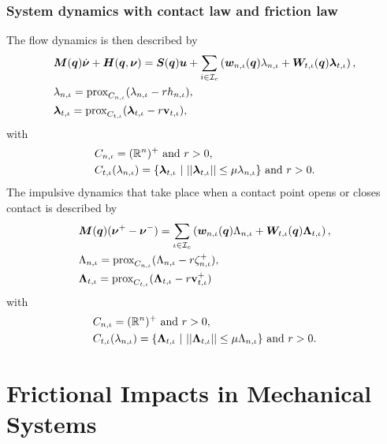 \documentclass[../DC2019003Bouma.tex]{subfiles}
\begin{document}
\subsection{System dynamics with contact law and friction law}
The flow dynamics is then described by
\begin{align}
&{\boldsymbol{M}}({\boldsymbol{q}})\dot{\boldsymbol{\nu}} + {\boldsymbol{H}}({\boldsymbol{q}},\boldsymbol{\nu}) = {\boldsymbol{S}}({\boldsymbol{q}}){\boldsymbol{u}} + \sum_{i\in\mathcal{I}_c}\left({\boldsymbol{w}}_{n,\iota}({\boldsymbol{q}})\lambda_{n,\iota} + {\boldsymbol{W}}_{t,\iota}({\boldsymbol{q}})\boldsymbol{\lambda}_{t,\iota} \right), \label{eq:proxcontact1}\\
&\lambda_{n,\iota} = \operatorname{\text{prox}}_{C_{n,\iota}}(\lambda_{n,\iota} - rh_{n,\iota}),\label{eq:proxcontact2}\\
&\boldsymbol{\lambda}_{t,\iota} = \operatorname{\text{prox}}_{C_{t,\iota}}(\boldsymbol{\lambda}_{t,\iota} - r\mathbf{v}_{t,\iota}),\label{eq:proxcontact3}
\end{align}
with
\begin{align}
&C_{n,\iota} = (\Rbb^n)^+\text{ and } r>0,\\
&C_{t,\iota}(\lambda_{n,\iota}) = \{\lambdab_{t,\iota}\ |\ ||\lambdab_{t,\iota}|| \leq \mu\lambda_{n,\iota}\}\text{ and }r>0.
\end{align}
The impulsive dynamics that take place when a contact point opens or closes contact is described by
\begin{align}
&{\boldsymbol{M}}({\boldsymbol{q}})(\boldsymbol{\nu}^+ - \boldsymbol{\nu}^-) = \sum_{\iota\in\mathcal{I}_c}\left( {\boldsymbol{w}}_{n,\iota}({\boldsymbol{q}})\Lambda_{n,\iota} + {\boldsymbol{W}}_{t,\iota}({\boldsymbol{q}})\boldsymbol{\Lambda}_{t,\iota}\right), \label{eq:proximpact1}\\
&\Lambda_{n,\iota} = \operatorname{\text{prox}}_{C_{n,\iota}}(\Lambda_{n,\iota} - r\zeta^+_{n,\iota}),\label{eq:proximpact2}\\
&\boldsymbol{\Lambda}_{t,\iota} = \operatorname{\text{prox}}_{C_{t,\iota}}(\boldsymbol{\Lambda}_{t,\iota} - r\mathbf{v}^+_{t,\iota})\,\label{eq:proximpact3}
\end{align}
with
\begin{align}
&C_{n,\iota} = (\Rbb^n)^+\text{ and } r>0,\\
&C_{t,\iota}(\lambda_{n,\iota}) = \{\Lambdab_{t,\iota}\ |\ ||\Lambdab_{t,\iota}|| \leq \mu\Lambda_{n,\iota}\}\text{ and }r>0.
\end{align}

\pagestyle{fancyreport}
\cleartooddpage
\pagestyle{fancyreport}
\chapter{Frictional Impacts in Mechanical Systems}
\end{document}
